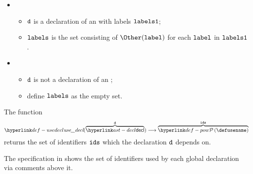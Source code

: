 \ProseParagraph
\OneApplies
\begin{itemize}
  \item {}
  \begin{itemize}
    \item $\texttt{d}$ is a declaration of an \enumerationtypeterm{} with labels $\texttt{labels1}$;
    \item $\texttt{labels}$ is the set consisting of $\Other(\vlabel)$ for each $\texttt{label}$ in $\texttt{labels1}$.
  \end{itemize}

  \item {}
  \begin{itemize}
    \item $\texttt{d}$ is not a declaration of an \enumerationtypeterm{};
    \item define $\texttt{labels}$ as the empty set.
  \end{itemize}
\end{itemize}

\FormallyParagraph
{}

\hypertarget{def-usedecl}{}
The function
\[
\usedecl(\overname{\decl}{\vd}) \aslto \overname{\pow{\defusename}}{\ids}
\]
returns the set of identifiers $\texttt{ids}$ which the declaration $\texttt{d}$ depends on.

The specification in  shows the set of identifiers
used by each global declaration via comments above it.

